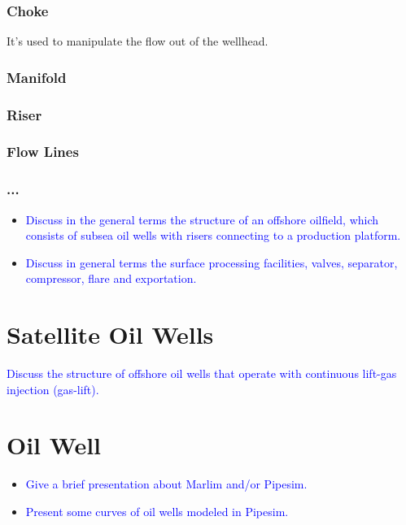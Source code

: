 \subsubsection{Choke}
It's used to manipulate the flow out of the wellhead.


\subsubsection{Manifold}



\subsubsection{Riser}



\subsubsection{Flow Lines}

\subsubsection{...}

\begin{itemize}

\item \textcolor{blue}{Discuss in the general terms the structure of an offshore oilfield, which consists of subsea oil wells with risers connecting to a production platform.}

\item \textcolor{blue}{Discuss in general terms the surface processing facilities, valves, separator, compressor, flare and exportation.}

\end{itemize}


\section{Satellite Oil Wells}

\textcolor{blue}{Discuss the structure of offshore oil wells that operate with continuous lift-gas injection (gas-lift).}



\section{Oil Well}


\begin{itemize}

\item \textcolor{blue}{Give a brief presentation about Marlim and/or Pipesim.}

\item \textcolor{blue}{Present some curves of oil wells modeled in Pipesim.}


\end{itemize}
